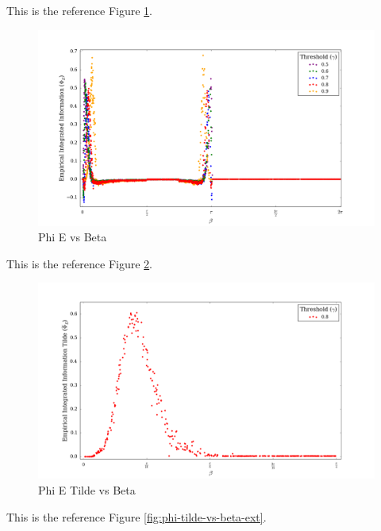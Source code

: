 \documentclass[a4paper,11pt]{article}
\begin{document}
This is the reference Figure \ref{fig:phi-vs-beta-ext-multi}.

\begin{figure}[H]
\begin{center}
\includegraphics[scale = 0.35]{figures/phi_vs_beta_ext_multi}
\caption{
	Phi E vs Beta
	\label{fig:phi-vs-beta-ext-multi}
}
\end{center}
\end{figure}



This is the reference Figure \ref{fig:phi-tilde-vs-beta-orig}.

\begin{figure}[H]
\begin{center}
\includegraphics[scale = 0.35]{figures/phi_tilde_vs_beta_orig}
\caption{
	Phi E Tilde vs Beta
	\label{fig:phi-tilde-vs-beta-orig}
}
\end{center}
\end{figure}

This is the reference Figure \ref{fig:phi-tilde-vs-beta-ext}.
\end{document}
